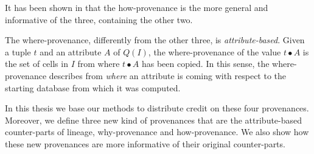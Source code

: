 It has been shown in \citep{CheneyProvSurvey} that the how-provenance is the more general and informative of the three, containing the other two.

The where-provenance, differently from the other three, is \emph{attribute-based}. Given a tuple $t$ and an attribute $A$ of $Q(I)$, the where-provenance of the value $t \bullet A$ is the set of cells in $I$ from where $t \bullet A$ has been copied. In this sense, the where-provenance describes from \emph{where} an attribute is coming with respect to the starting database from which it was computed. 

In this thesis we base our methods to distribute credit on these four provenances. Moreover, we define three new kind of provenances that are the attribute-based counter-parts of lineage, why-provenance and how-provenance. We also show how these new provenances are more informative of their original counter-parts. 
